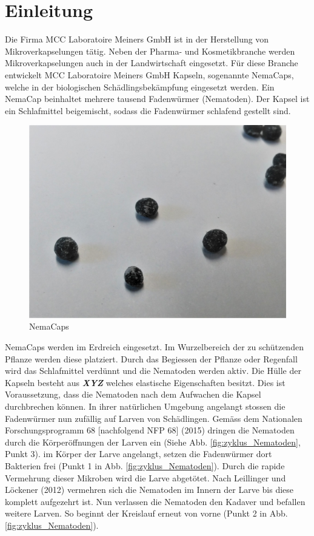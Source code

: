 \newpage
\section{Einleitung}
Die Firma MCC Laboratoire Meiners GmbH ist in der Herstellung von Mikroverkapselungen tätig. Neben der Pharma- und Kosmetikbranche werden Mikroverkapselungen auch in der Landwirtschaft eingesetzt. Für diese Branche entwickelt MCC Laboratoire Meiners GmbH Kapseln, sogenannte NemaCaps, welche in der biologischen Schädlingsbekämpfung eingesetzt werden. Ein NemaCap beinhaltet mehrere tausend Fadenwürmer (Nematoden). Der Kapsel ist ein Schlafmittel beigemischt, sodass die Fadenwürmer schlafend gestellt sind. 
\begin{figure}[H]
	\includegraphics[width=1\textwidth]{Illustrationen/3-Einleitung/nemacaps.jpg}
	\caption{NemaCaps}
	\label{fig:nemacaps}
\end{figure}
NemaCaps werden im Erdreich eingesetzt. Im Wurzelbereich der zu schützenden Pflanze werden diese platziert. Durch das Begiessen der Pflanze oder Regenfall wird das Schlafmittel verdünnt und die Nematoden werden aktiv. Die Hülle der Kapseln besteht aus \textbf{\textit{XYZ}} welches elastische Eigenschaften besitzt. Dies ist Voraussetzung, dass die Nematoden nach dem Aufwachen die Kapsel durchbrechen können.\newline
In ihrer natürlichen Umgebung angelangt stossen die Fadenwürmer nun zufällig auf Larven von Schädlingen. Gemäss dem Nationalen Forschungsprogramm 68 [nachfolgend NFP 68] (2015) dringen die Nematoden durch die Körperöffnungen der Larven ein (Siehe Abb.  \ref{fig:zyklus_Nematoden}, Punkt 3). im Körper der Larve angelangt, setzen die Fadenwürmer dort Bakterien frei (Punkt 1 in Abb.  \ref{fig:zyklus_Nematoden}). Durch die rapide Vermehrung dieser Mikroben wird die Larve abgetötet. Nach Leillinger und Löckener (2012) vermehren sich die Nematoden im Innern der Larve bis diese komplett aufgezehrt ist. Nun verlassen die Nematoden den Kadaver und befallen weitere Larven. So beginnt der Kreislauf erneut von vorne (Punkt 2 in Abb.  \ref{fig:zyklus_Nematoden}).\newline
